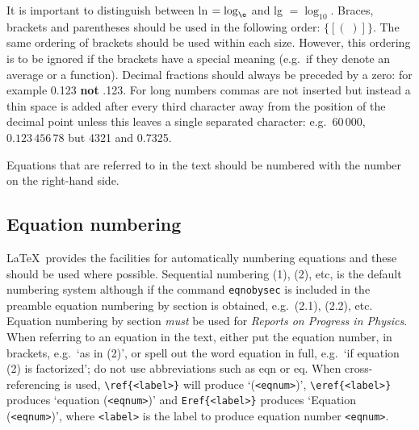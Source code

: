 It is important to distinguish between ln $= \log_\e$ and lg
$=\log_{10}$. Braces, brackets and parentheses should be used in the
following order: $\{[(\;)]\}$. The same ordering of brackets should be
used within each size. However, this ordering is to be ignored if the
brackets have a
special meaning (e.g.\ if they denote an average or a function).  Decimal
fractions should
always be preceded by a zero: for example 0.123 {\bf not} .123. For long
numbers commas are not inserted but instead a thin space is added after
every third character away from the position of the decimal point unless
this leaves a single separated character: e.g.\ $60\,000$, $0.123\,456\,78$
but 4321 and 0.7325.

Equations that are referred to in the text should be numbered with
the number on the right-hand side.


\subsection{Equation numbering\label{eqnum}}
\LaTeX\ provides the facilities for automatically numbering equations
and these should be used where possible. Sequential numbering (1), (2), etc,
is the default numbering system although if the command
\verb"eqnobysec" is included in the preamble equation numbering
by section is obtained, e.g.\
(2.1), (2.2), etc. Equation numbering by section {\it must}
be used for {\it Reports on Progress in
Physics}. When referring to an equation in the text, either put
the equation number, in brackets, e.g.\ `as in (2)', or spell out the
word equation in full, e.g.\ `if equation (2) is factorized'; do not
use abbreviations such as eqn or eq.
When cross-referencing is used, \verb"\ref{<label>}"
 will produce `(\verb"<eqnum>")',
\verb"\eref{<label>}" produces `equation (\verb"<eqnum>")' and
\verb"Eref{<label>}" produces `Equation (\verb"<eqnum>")',
where \verb"<label>"
is the
label to produce equation number \verb"<eqnum>".


